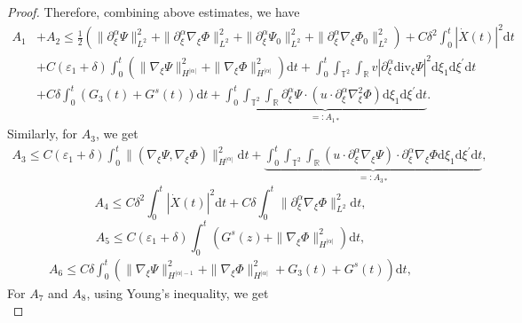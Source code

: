 \documentclass[10pt,reqno]{amsart}
\numberwithin{equation}{section}
\newcommand{\dif}{\mathrm{d}}
\newcommand{\ddiv}{\mathrm{div}}
\begin{document}
\begin{proof}
Therefore, combining above estimates, we have
\begin{equation}\label{a1a2}
\begin{aligned}
A_1&+A_2\le \frac{1}{2}\left(\|\partial_\xi^\alpha\Psi\|_{L^2}^2+\|\partial_\xi^\alpha\nabla_\xi\Phi\|_{L^2}^2
+\|\partial_\xi^\alpha\Psi_0\|_{L^2}^2+\|\partial_\xi^\alpha\nabla_\xi\Phi_0\|_{L^2}^2\right)
+C\delta^2\int_0^t|\dot X(t)|^2\dif t\\
&
+C(\varepsilon_1+\delta)\int_0^t\left(\|\nabla_\xi\Psi\|_{H^{|\alpha|}}^2+\|\nabla_\xi\Phi\|_{H^{|\alpha|}}^2\right)\dif t
+\int_0^t\int_{\mathbb{T}^2}\int_{\mathbb{R}}
v|\partial_\xi^\alpha\ddiv_\xi\Psi|^2
\dif \xi_1\dif \xi^{\prime}\dif t
\\
&+C\delta\int_0^t\left(G_3(t)+G^s(t)\right)
\dif t
+\underbrace{\int_0^t\int_{\mathbb{T}^2}\int_{\mathbb{R}}\partial_\xi^\alpha\Psi\cdot\left(u\cdot\partial_\xi^\alpha\nabla_\xi^2\Phi\right)
\dif \xi_1\dif \xi^{\prime}\dif t}\limits_{=:A_{1\ast}}.
\end{aligned}
\end{equation}
Similarly, for $A_3$, we get
\begin{equation}\label{a3}
\begin{aligned}
A_3
\le C(\varepsilon_1+\delta)
\int_0^t\|(\nabla_\xi\Psi, \nabla_\xi\Phi)\|_{H^{|\alpha|}}^2\dif t
+\underbrace{\int_0^t\int_{\mathbb{T}^2}\int_{\mathbb{R}}\left( u\cdot\partial_\xi^\alpha\nabla_\xi\Psi\right)\cdot\partial_\xi^\alpha\nabla_\xi\Phi
\dif \xi_1\dif \xi^{\prime}\dif t}\limits_{=:A_{3\ast}},
\end{aligned}
\end{equation}
\begin{equation}\label{a4}
A_4\le C\delta^2\int_{0}^{t}|\dot{X}(t)|^2\dif t+C\delta\int_0^t\|\partial_\xi^\alpha\nabla_\xi\Phi\|_{L^2}^2\dif t,
\end{equation}
\begin{equation}\label{a5}
A_5\le C(\varepsilon_1+\delta)\int_0^t\left(G^s(z)+\|\nabla_\xi\Phi\|_{H^{|\alpha|}}^2\right)\dif t,
\end{equation}
\begin{equation}\label{a6}
\begin{aligned}
A_6\le C\delta\int_0^t\left(\|\nabla_\xi\Psi\|_{H^{|\alpha|-1}}^2+\|\nabla_\xi\Phi\|_{H^{|\alpha|}}^2+G_3(t)+G^s(t)\right)
\dif t,
\end{aligned}
\end{equation}
For $A_7$ and $A_8$, using Young's inequality, we get
\begin{equation}\label{a8}

\end{equation}
\end{proof}
\end{document}
